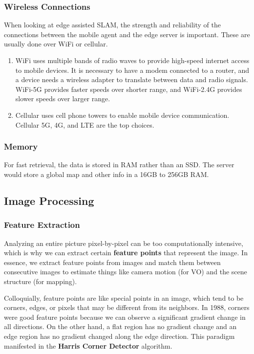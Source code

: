 \documentclass{article}
\theoremstyle{definition}
\theoremstyle{remark}
\theoremstyle{definition}
\begin{document}
\subsubsection{Wireless Connections}

When looking at edge assisted SLAM, the strength and reliability of the connections between the mobile agent and the edge server is important. These are usually done over WiFi or cellular. 
\begin{enumerate}
    \item WiFi uses multiple bands of radio waves to provide high-speed internet access to mobile devices. It is necessary to have a modem connected to a router, and a device needs a wireless adapter to translate between data and radio signals. WiFi-5G provides faster speeds over shorter range, and WiFi-2.4G provides slower speeds over larger range. 
    \item Cellular uses cell phone towers to enable mobile device communication. Cellular 5G, 4G, and LTE are the top choices. 
\end{enumerate}

\subsubsection{Memory}

For fast retrieval, the data is stored in RAM rather than an SSD. The server would store a global map and other info in a 16GB to 256GB RAM. 
\subsection{Image Processing}
 
\subsubsection{Feature Extraction}

Analyzing an entire picture pixel-by-pixel can be too computationally intensive, which is why we can extract certain \textbf{feature points} that represent the image. In essence, we extract feature points from images and match them between consecutive images to estimate things like camera motion (for VO) and the scene structure (for mapping). 

Colloquially, feature points are like special points in an image, which tend to be corners, edges, or pixels that may be different from its neighbors. In 1988, corners were good feature points because we can observe a significant gradient change in all directions. On the other hand, a flat region has no gradient change and an edge region has no gradient changed along the edge direction. This paradigm manifested in the \textbf{Harris Corner Detector} algorithm. 
\end{document}
